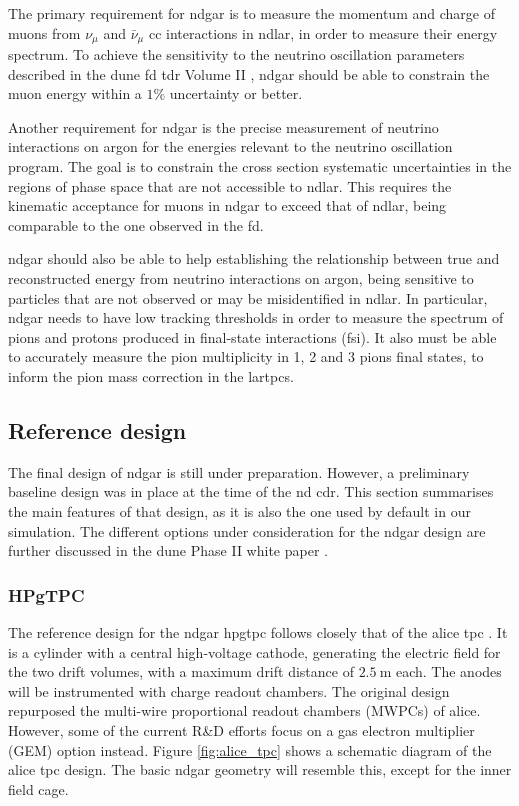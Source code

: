 The primary requirement for \gls{ndgar} is to measure the momentum and charge of muons from $\nu_{\mu}$ and $\bar{\nu}_{\mu}$ \gls{cc} interactions in \gls{ndlar}, in order to measure their energy spectrum. To achieve the sensitivity to the neutrino oscillation parameters described in the \gls{dune} \gls{fd} \gls{tdr} Volume II \cite{DUNE2020TDR2}, \gls{ndgar} should be able to constrain the muon energy within a $1\%$ uncertainty or better.

Another requirement for \gls{ndgar} is the precise measurement of neutrino interactions on argon for the energies relevant to the neutrino oscillation program. The goal is to constrain the cross section systematic uncertainties in the regions of phase space that are not accessible to \gls{ndlar}. This requires the kinematic acceptance for muons in \gls{ndgar} to exceed that of \gls{ndlar}, being comparable to the one observed in the \gls{fd}.

\gls{ndgar} should also be able to help establishing the relationship between true and reconstructed energy from neutrino interactions on argon, being sensitive to particles that are not observed or may be misidentified in \gls{ndlar}. In particular, \gls{ndgar} needs to have low tracking thresholds in order to measure the spectrum of pions and protons produced in final-state interactions (\gls{fsi}). It also must be able to accurately measure the pion multiplicity in 1, 2 and 3 pions final states, to inform the pion mass correction in the \gls{lartpc}s.

\subsection{Reference design}\label{subsec:ndgar_design}

The final design of \gls{ndgar} is still under preparation. However, a preliminary baseline design was in place at the time of the \gls{nd} \gls{cdr}. This section summarises the main features of that design, as it is also the one used by default in our simulation. The different options under consideration for the \gls{ndgar} design are further discussed in the \gls{dune} Phase II white paper \cite{DUNE2024Phase2}.

\subsubsection{HPgTPC}

The reference design for the \gls{ndgar} \gls{hpgtpc} follows closely that of the \gls{alice} \gls{tpc} \cite{ALICE2006}. It is a cylinder with a central high-voltage cathode, generating the electric field for the two drift volumes, with a maximum drift distance of $2.5~\mathrm{m}$ each. The anodes will be instrumented with charge readout chambers. The original design repurposed the multi-wire proportional readout chambers (MWPCs) of \gls{alice}. However, some of the current R\&D efforts focus on a gas electron multiplier (GEM) \cite{Sauli1997} option instead. Figure \ref{fig:alice_tpc} shows a schematic diagram of the \gls{alice} \gls{tpc} design. The basic \gls{ndgar} geometry will resemble this, except for the inner field cage.

